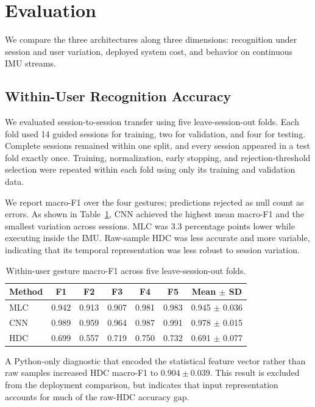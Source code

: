 \section{Evaluation}

We compare the three architectures along three dimensions: recognition under
session and user variation, deployed system cost, and behavior on continuous
IMU streams.

\subsection{Within-User Recognition Accuracy}

We evaluated session-to-session transfer using five leave-session-out folds.
Each fold used 14 guided sessions for training, two for validation, and four
for testing. Complete sessions remained within one split, and every session
appeared in a test fold exactly once. Training, normalization, early stopping,
and rejection-threshold selection were repeated within each fold using only
its training and validation data.

We report macro-F1 over the four gestures; predictions rejected as null count
as errors. As shown in Table~\ref{tab:within_user}, CNN achieved the highest
mean macro-F1 and the smallest variation across sessions. MLC was 3.3
percentage points lower while executing inside the IMU. Raw-sample HDC was
less accurate and more variable, indicating that its temporal representation
was less robust to session variation.

\begin{table}[t]
    \centering
    \caption{Within-user gesture macro-F1 across five leave-session-out folds.}
    \label{tab:within_user}
    \small
    \begin{tabular}{lcccccc}
        \toprule
        Method & F1 & F2 & F3 & F4 & F5 & Mean $\pm$ SD \\
        \midrule
        MLC & 0.942 & 0.913 & 0.907 & 0.981 & 0.983
            & 0.945 $\pm$ 0.036 \\
        CNN & 0.989 & 0.959 & 0.964 & 0.987 & 0.991
            & 0.978 $\pm$ 0.015 \\
        HDC & 0.699 & 0.557 & 0.719 & 0.750 & 0.732
            & 0.691 $\pm$ 0.077 \\
        \bottomrule
    \end{tabular}
\end{table}

A Python-only diagnostic that encoded the statistical feature vector rather
than raw samples increased HDC macro-F1 to $0.904 \pm 0.039$. This result is
excluded from the deployment comparison, but indicates that input
representation accounts for much of the raw-HDC accuracy gap.

